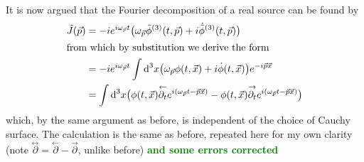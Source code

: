 It is now argued that the Fourier decomposition of a real source can be found by
\begin{subequations}
    \begin{align}
        \tilde{J}(\vec{p}) & =-{i} e^{{i}\omega_{\vec{p}}t}\big(\omega_{\vec{p}}\tilde{\phi}^{(3)}(t,\vec{p})+{i}\dot{\tilde{\phi}}^{(3)}(t,\vec{p})\big)                                                                         \\
        \intertext{from which by substitution we derive the form}
                           & =-{i} e^{{i}\omega_{\vec{p}}t}\int\text{d}^3x\big(\omega_{\vec{p}}\phi(t,\vec{x})+{i}\dot{\phi}(t,\vec{x})\big)e^{-{i}\vec{p}\vec{x}}                                                                  \\
                           & =\int\text{d}^3x\big(\phi(t,\vec{x})\overset{\leftarrow}{\partial_t}e^{{i}(\omega_{\vec{p}}t-\vec{p}\vec{x})}-\phi(t,\vec{x})\overset{\rightarrow}{\partial_t}e^{{i}(\omega_{\vec{p}}t-\vec{p}\vec{x})}\big)
    \end{align}
\end{subequations}
which, by the same argument as before, is independent of the choice of Cauchy surface. The calculation is the same as before, repeated here for my own clarity (note $\overset{\leftrightarrow}{\partial}=\overset{\leftarrow}{\partial}-\overset{\rightarrow}{\partial}$, unlike before) \textcolor{green}{\textbf{and some errors corrected}}
